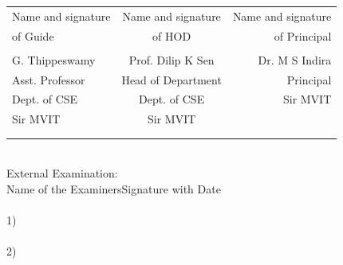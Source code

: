 \documentclass[10pt,a4paper]{article}
\newcommand{\tabcer}{\hspace*{1 cm}}
\begin{document}
\vspace{8mm}




\begin{table}[h]
\begin{tabular}{l c r}
Name and signature \tabcer & Name and signature \tabcer  & Name and signature  \\
of Guide   \tabcer &   of HOD             \tabcer & \tabcer of Principal \\
\\ 
G. Thippeswamy \tabcer & Prof. Dilip K Sen \tabcer & Dr. M S Indira \\
Asst. Professor \tabcer & Head of Department \tabcer & Principal \\
Dept. of CSE	\tabcer & Dept. of CSE \tabcer &	Sir MVIT \\
Sir MVIT \tabcer & Sir MVIT \tabcer \\ \\ \\ 
\end{tabular}
\end{table} \\
External Examination: \\ 

Name of the Examiners\tabcer \tabcer  \tabcer \tabcer \tabcer  Signature with Date \\ \\

1) \\ \\

2)
\end{document}
